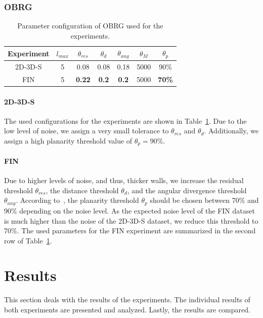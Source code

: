 \documentclass[main.tex]{subfiles}
\begin{document}
\subsubsection{OBRG}
\begin{table}[H]
    \centering
    \begin{tabular}{c|cccccc}
        Experiment & $l_{max}$ & $\theta_{res}$ & $\theta_{d}$ & $\theta_{ang}$ & $\theta_M$ & $\theta_p$    \\ \hline
        2D-3D-S    & 5         & 0.08           & 0.08         & 0.18           & 5000       & 90\%          \\
        FIN        & 5         & \textbf{0.22}  & \textbf{0.2} & \textbf{0.2}   & 5000       & \textbf{70\%}
    \end{tabular}
    \caption{Parameter configuration of OBRG used for the experiments.}
    \label{tab:obrg-param}
\end{table}


\paragraph{2D-3D-S}
The used configurations for the experiments are shown in Table~\ref{tab:obrg-param}.
Due to the low level of noise, we assign a very small tolerance to $\theta_{res}$ and $\theta_d$. Additionally, we assign a high
planarity threshold value of $\theta_p = 90\%$.

\paragraph{FIN}
Due to higher levels of noise, and thus, thicker walls, we increase the residual threshold $\theta_{res}$, the distance
threshold $\theta_d$, and the angular divergence threshold $\theta_{ang}$. According to~\cite[Section~3.4]{Vo_Truong-Hong_Laefer_Bertolotto_2015},
the planarity threshold $\theta_p$ should be chosen between 70\% and 90\% depending on the noise level. As the expected noise level of the
FIN dataset is much higher than the noise of the 2D-3D-S dataset, we reduce this threshold to 70\%.
The used parameters for the FIN experiment are summarized in the second row of Table~\ref{tab:obrg-param}.


\section{Results}
This section deals with the results of the experiments.
The individual results of both experiments are presented and analyzed. Lastly, the results are compared.
\end{document}
